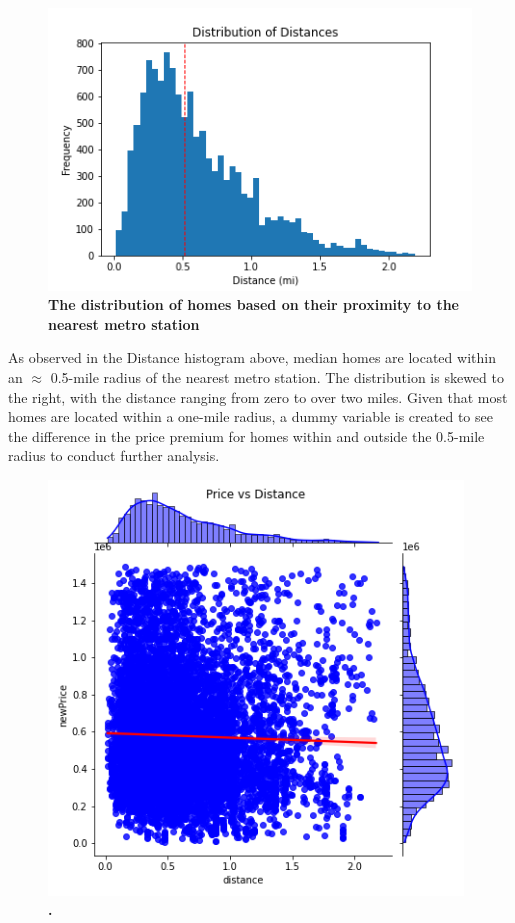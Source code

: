 \documentclass[12pt]{report}
\begin{document}
\begin{figure}[h]
\begin{center}
\caption{\textbf{The distribution of homes based on their proximity to the nearest metro station}}
\includegraphics[width=130mm]{distanceHist.png}
\end{center}
\label{fig:distanceHist}
\end{figure}
As observed in the Distance histogram above, median homes are located within an $\approx$ 0.5-mile radius of the nearest metro station. The distribution is skewed to the right, with the distance ranging from zero to over two miles. Given that most homes are located within a one-mile radius, a dummy variable is created to see the difference in the price premium for homes within and outside the 0.5-mile radius to conduct further analysis.
\clearpage

\begin{figure}[h]
\begin{center}
\includegraphics[width=110mm]{DistanceJoint.png}
\end{center}
\caption{\textbf{.}}
\label{fig:distanceJoint}
\end{figure}
\end{document}
